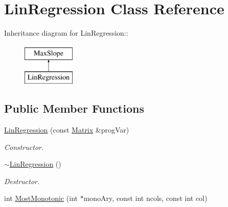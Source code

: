 \hypertarget{classLinRegression}{
\section{LinRegression Class Reference}
\label{de/d89/classLinRegression}
}
Inheritance diagram for LinRegression::\begin{figure}[H]
\begin{center}
\leavevmode
\includegraphics[height=2cm]{de/d89/classLinRegression}
\end{center}
\end{figure}
\subsection*{Public Member Functions}
\begin{DoxyCompactItemize}
\item 
\hypertarget{classLinRegression_a0d747e38f7a8997765be15f43062290c}{
\hyperlink{classLinRegression_a0d747e38f7a8997765be15f43062290c}{LinRegression} (const \hyperlink{classMatrix}{Matrix} \&progVar)}
\label{de/d89/classLinRegression_a0d747e38f7a8997765be15f43062290c}

\begin{DoxyCompactList}\small\item\em Constructor. \item\end{DoxyCompactList}\item 
\hypertarget{classLinRegression_a4ea5ffb8032172bdf54d1f2d4041d520}{
\hyperlink{classLinRegression_a4ea5ffb8032172bdf54d1f2d4041d520}{$\sim$LinRegression} ()}
\label{de/d89/classLinRegression_a4ea5ffb8032172bdf54d1f2d4041d520}

\begin{DoxyCompactList}\small\item\em Destructor. \item\end{DoxyCompactList}\item 
int \hyperlink{classLinRegression_a1f245c4e47637f3f1d94f6129861406d}{MostMonotonic} (int $\ast$monoAry, const int ncols, const int col)
\end{DoxyCompactItemize}


